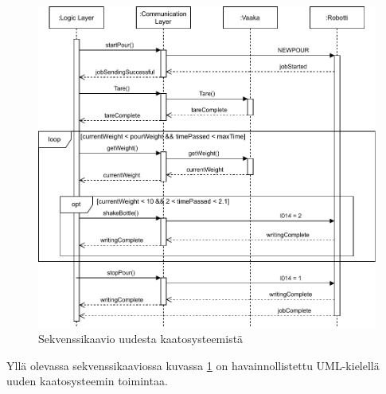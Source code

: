 \begin{figure}[!h]
\begin{center}
\includegraphics[scale=0.8]{img/sequence.pdf}   %
\end{center}
\caption{Sekvenssikaavio uudesta kaatosysteemistä}
\label{fig:Sequence}
\end{figure}

Yllä olevassa sekvenssikaaviossa kuvassa \ref{fig:Sequence} on havainnollistettu UML-kielellä uuden kaatosysteemin toimintaa.
